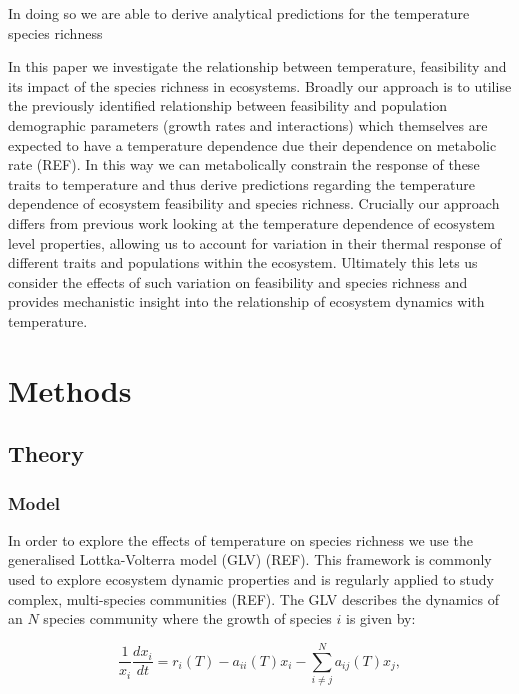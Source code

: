 \documentclass{article}
\begin{document}
In doing so we are able to derive analytical predictions for the temperature species richness 

In this paper we investigate the relationship between temperature, feasibility and its impact of the species richness in ecosystems. Broadly our approach is to utilise the previously identified relationship between feasibility and population demographic parameters (growth rates and interactions) which themselves are expected to have a temperature dependence due their dependence on metabolic rate (REF). In this way we can metabolically constrain the response of these traits to temperature and thus derive predictions regarding the temperature dependence of ecosystem feasibility and species richness. Crucially our approach differs from previous work looking at the temperature dependence of ecosystem level properties, allowing us to account for variation in their thermal response of different traits and populations within the ecosystem. Ultimately this lets us consider the effects of such variation on feasibility and species richness and provides mechanistic insight into the relationship of ecosystem dynamics with temperature.

\section{Methods}
\subsection{Theory}
\subsubsection{Model}
In order to explore the effects of temperature on species richness we use the generalised Lottka-Volterra model (GLV) (REF). This framework is commonly used to explore ecosystem dynamic properties and is regularly applied to study complex, multi-species communities (REF). The GLV describes the dynamics of an $N$ species community where the growth of species $i$ is given by:

\begin{equation} \label{EQ:GLV}
  \frac{1}{x_i} \frac{dx_i}{dt} = r_i(T) - a_{ii}(T) x_i - \sum^N_{i \neq j} a_{ij}(T) x_j, 
\end{equation}
\end{document}
